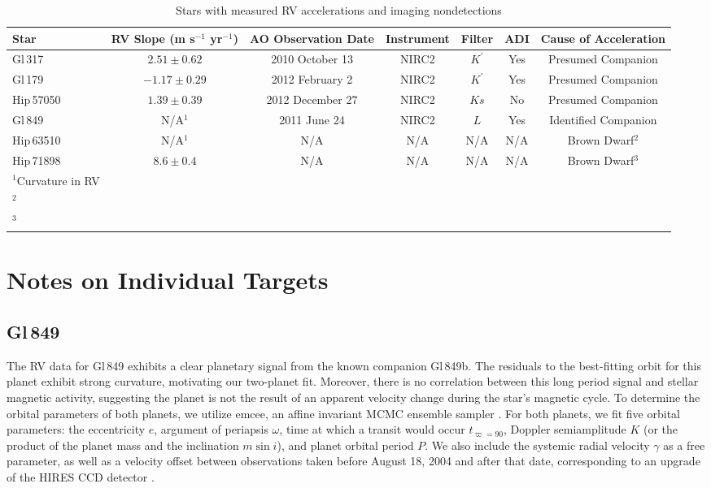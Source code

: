 \begin{landscape}
\begin{table}[hbt!]
\footnotesize
\centering
\begin{tabular}{lcccccc}
\hline
Star & RV Slope (m s$^{-1}$ yr$^{-1}$) & AO Observation Date & Instrument & Filter & ADI & Cause of Acceleration \\
 \hline
     Gl\,317 & $2.51 \pm 0.62$ & 2010 October 13 & NIRC2  & $K^\prime$ & Yes & Presumed Companion  \\
  Gl\,179 & $-1.17 \pm 0.29$ &  2012 February 2 & NIRC2 &  $K^\prime$ & Yes & Presumed Companion \\ 
  Hip\,57050 & $1.39 \pm 0.39$ & 2012 December 27 & NIRC2 & $Ks$ &  No & Presumed Companion \\
 Gl\,849 & N/A$^1$ & 2011 June 24 &  NIRC2 &  $L$ &  Yes & Identified Companion \\ 
  Hip\,63510 & N/A$^{1}$ & N/A & N/A &  N/A & N/A & Brown Dwarf$^2$  \\ 
  Hip\,71898 & $8.6 \pm 0.4$ &  N/A & N/A &  N/A & N/A & Brown Dwarf$^3$ \\
\hline
 $^1$Curvature in RV & & & & & & \\
 $^2$\citet{Beuzit04} & & & & & & \\
 $^3$\citet{Golimowski04} & & & & & &
\end{tabular}
\caption{Stars with measured RV accelerations and imaging nondetections}
\label{T2}
\end{table}
\end{landscape}
\clearpage

\section{Notes on Individual Targets}
\label{Notes}

\subsection{Gl\,849}
The RV data for Gl\,849 exhibits a clear planetary signal from the known companion Gl\,849b. The residuals to the best-fitting orbit for this planet exhibit strong curvature, motivating our two-planet fit. Moreover, there is no correlation between this long period signal and stellar magnetic activity, suggesting the planet is not the result of an apparent velocity change during the star's magnetic cycle. To determine the orbital parameters of both planets, we utilize emcee, an affine invariant MCMC ensemble sampler \citep{Foreman-Mackey12}. For both planets, we fit five orbital parameters: the eccentricity $e$, argument of periapsis $\omega$, time at which a transit would occur $t_{\varpi=90}$, Doppler semiamplitude $K$ (or the product of the planet mass and the inclination $m \sin i$), and planet orbital period $P$. We also include the systemic radial velocity $\gamma$ as a free parameter, as well as a velocity offset between observations taken before August 18, 2004 and after that date, corresponding to an upgrade of the HIRES CCD detector \citep{Wright11}.


